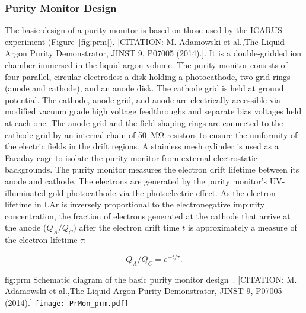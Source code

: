 \subsubsection{Purity Monitor Design}

The basic design of a purity monitor is based on those used by the ICARUS experiment (Figure~\ref{fig:prm})\cite{Adamowski}. [CITATION: M. Adamowski et al.,The Liquid Argon Purity Demonstrator, JINST 9, P07005 (2014).]. It is a double-gridded ion chamber immersed in the liquid argon volume.   The purity monitor consists of four parallel, circular electrodes: a disk holding a photocathode, two grid rings (anode and cathode), and an anode disk. The cathode grid is held at ground potential. The cathode, anode grid, and anode are electrically accessible via modified vacuum grade high voltage feedthroughs and separate bias voltages held at each one.  The anode grid and the field shaping rings are connected to the cathode grid by an internal chain of \SI{50}{\mega\ohm} resistors to ensure the uniformity of the electric fields in the drift regions. A stainless mesh cylinder is used as a Faraday cage to isolate the purity monitor from external electrostatic backgrounds. The purity monitor measures the electron drift lifetime between its anode and cathode. The electrons are generated by the purity monitor's UV-illuminated gold photocathode via the photoelectric effect. As the electron lifetime in LAr is inversely proportional to the electronegative impurity concentration, the fraction of electrons generated at the cathode that arrive at the anode ($Q_A/Q_C$) after the electron drift time $t$ is approximately a measure of the electron lifetime $\tau$: 

$$ Q_A/Q_C=e^{-t/\tau}. $$

\begin{dunefigure}{fig:prm}
  {Schematic diagram of the basic purity monitor design~\cite{Adamowski}. [CITATION: M. Adamowski et al.,The Liquid Argon Purity Demonstrator, JINST 9, P07005 (2014).]}
  \texttt{[image: PrMon\_prm.pdf]}
\end{dunefigure}

